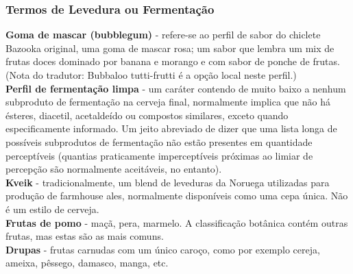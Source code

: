 \subsubsection*{Termos de Levedura ou Fermentação}
\textbf{Goma de mascar (bubblegum)} - refere-se ao perfil de sabor do chiclete Bazooka original, uma goma de mascar rosa; um sabor que lembra um mix de frutas doces dominado por banana e morango e com sabor de ponche de frutas.\\
(Nota do tradutor: Bubbaloo tutti-frutti é a opção local neste perfil.)\\
\textbf{Perfil de fermentação limpa} - um caráter contendo de muito baixo a nenhum subproduto de fermentação na cerveja final, normalmente implica que não há ésteres, diacetil, acetaldeído ou compostos similares, exceto quando especificamente informado. Um jeito abreviado de dizer que uma lista longa de possíveis subprodutos de fermentação não estão presentes em quantidade perceptíveis (quantias praticamente imperceptíveis próximas ao limiar de percepção são normalmente aceitáveis, no entanto).\\
\textbf{Kveik} - tradicionalmente, um blend de leveduras da Noruega utilizadas para produção de farmhouse ales, normalmente disponíveis como uma cepa única. Não é um estilo de cerveja.\\
\textbf{Frutas de pomo} - maçã, pera, marmelo. A classificação botânica contém outras frutas, mas estas são as mais comuns.\\
\textbf{Drupas} - frutas carnudas com um único caroço, como por exemplo cereja, ameixa, pêssego, damasco, manga, etc.
